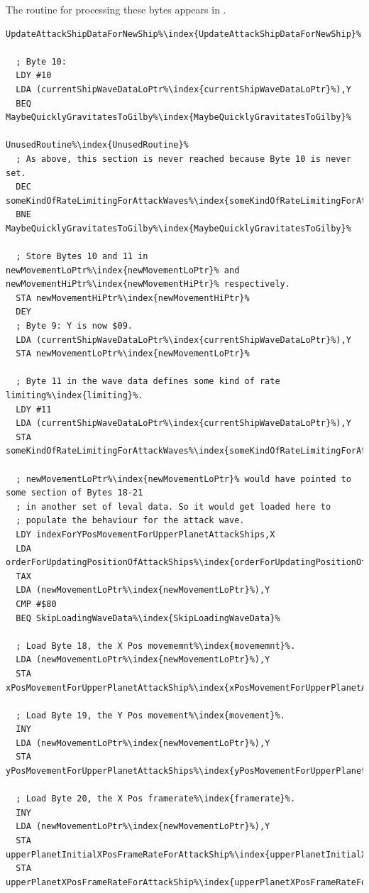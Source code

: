 The routine for processing these bytes appears in . 

\begin{lstlisting}[escapechar=\%]
UpdateAttackShipDataForNewShip%\index{UpdateAttackShipDataForNewShip}%

  ; Byte 10:
  LDY #10
  LDA (currentShipWaveDataLoPtr%\index{currentShipWaveDataLoPtr}%),Y
  BEQ MaybeQuicklyGravitatesToGilby%\index{MaybeQuicklyGravitatesToGilby}%

UnusedRoutine%\index{UnusedRoutine}%
  ; As above, this section is never reached because Byte 10 is never set.
  DEC someKindOfRateLimitingForAttackWaves%\index{someKindOfRateLimitingForAttackWaves}%,X
  BNE MaybeQuicklyGravitatesToGilby%\index{MaybeQuicklyGravitatesToGilby}%

  ; Store Bytes 10 and 11 in newMovementLoPtr%\index{newMovementLoPtr}% and newMovementHiPtr%\index{newMovementHiPtr}% respectively.
  STA newMovementHiPtr%\index{newMovementHiPtr}%
  DEY
  ; Byte 9: Y is now $09.
  LDA (currentShipWaveDataLoPtr%\index{currentShipWaveDataLoPtr}%),Y
  STA newMovementLoPtr%\index{newMovementLoPtr}%

  ; Byte 11 in the wave data defines some kind of rate limiting%\index{limiting}%.
  LDY #11
  LDA (currentShipWaveDataLoPtr%\index{currentShipWaveDataLoPtr}%),Y
  STA someKindOfRateLimitingForAttackWaves%\index{someKindOfRateLimitingForAttackWaves}%,X

  ; newMovementLoPtr%\index{newMovementLoPtr}% would have pointed to some section of Bytes 18-21
  ; in another set of leval data. So it would get loaded here to
  ; populate the behaviour for the attack wave.
  LDY indexForYPosMovementForUpperPlanetAttackShips,X
  LDA orderForUpdatingPositionOfAttackShips%\index{orderForUpdatingPositionOfAttackShips}%,X
  TAX
  LDA (newMovementLoPtr%\index{newMovementLoPtr}%),Y
  CMP #$80
  BEQ SkipLoadingWaveData%\index{SkipLoadingWaveData}%

  ; Load Byte 18, the X Pos movememnt%\index{movememnt}%.
  LDA (newMovementLoPtr%\index{newMovementLoPtr}%),Y
  STA xPosMovementForUpperPlanetAttackShip%\index{xPosMovementForUpperPlanetAttackShip}%,X
  
  ; Load Byte 19, the Y Pos movement%\index{movement}%.
  INY
  LDA (newMovementLoPtr%\index{newMovementLoPtr}%),Y
  STA yPosMovementForUpperPlanetAttackShips%\index{yPosMovementForUpperPlanetAttackShips}%,X

  ; Load Byte 20, the X Pos framerate%\index{framerate}%.
  INY
  LDA (newMovementLoPtr%\index{newMovementLoPtr}%),Y
  STA upperPlanetInitialXPosFrameRateForAttackShip%\index{upperPlanetInitialXPosFrameRateForAttackShip}%,X
  STA upperPlanetXPosFrameRateForAttackShip%\index{upperPlanetXPosFrameRateForAttackShip}%,X


\end{lstlisting}
